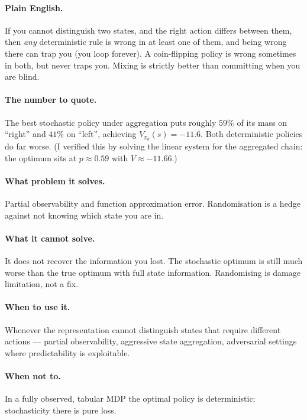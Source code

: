 \documentclass[11pt,a4paper]{article}
\begin{document}
\paragraph{Plain English.} If you cannot distinguish two states, and the right
action differs between them, then \emph{any} deterministic rule is wrong in at
least one of them, and being wrong there can trap you (you loop forever). A
coin-flipping policy is wrong sometimes in both, but never traps you. Mixing
is strictly better than committing when you are blind.

\paragraph{The number to quote.} The best stochastic policy under aggregation
puts roughly $59\%$ of its mass on ``right'' and $41\%$ on ``left'', achieving
$V_{\pi_\theta}(s)=-11.6$. Both deterministic policies do far worse. (I
verified this by solving the linear system for the aggregated chain: the
optimum sits at $p\approx0.59$ with $V\approx-11.66$.)

\paragraph{What problem it solves.} Partial observability and function
approximation error. Randomisation is a hedge against not knowing which state
you are in.

\paragraph{What it cannot solve.} It does not recover the information you lost.
The stochastic optimum is still much worse than the true optimum with full
state information. Randomising is damage limitation, not a fix.

\paragraph{When to use it.} Whenever the representation cannot distinguish
states that require different actions --- partial observability, aggressive
state aggregation, adversarial settings where predictability is exploitable.

\paragraph{When not to.} In a fully observed, tabular MDP the optimal policy is
deterministic; stochasticity there is pure loss.
\end{document}
